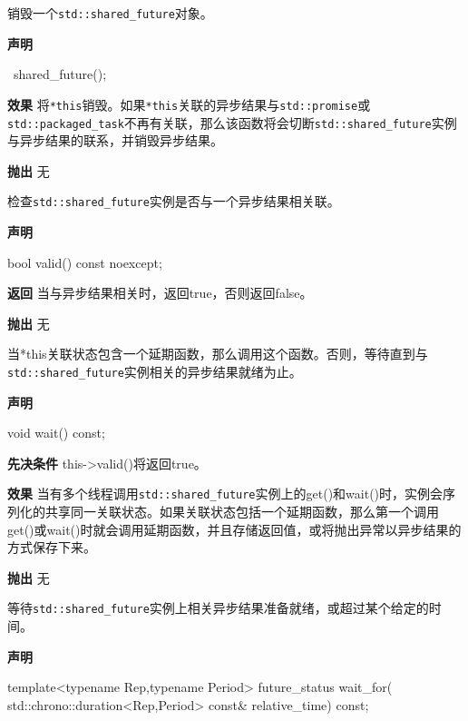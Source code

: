 
销毁一个\texttt{std::shared\_future}对象。

\textbf{声明}

\begin{cpp}
~shared_future();
\end{cpp}

\textbf{效果}
将\texttt{*this}销毁。如果\texttt{*this}关联的异步结果与\texttt{std::promise}或\texttt{std::packaged\_task}不再有关联，那么该函数将会切断\texttt{std::shared\_future}实例与异步结果的联系，并销毁异步结果。

\textbf{抛出}
无


检查\texttt{std::shared\_future}实例是否与一个异步结果相关联。

\textbf{声明}

\begin{cpp}
bool valid() const noexcept;
\end{cpp}

\textbf{返回}
当与异步结果相关时，返回true，否则返回false。

\textbf{抛出}
无


当*this关联状态包含一个延期函数，那么调用这个函数。否则，等待直到与\texttt{std::shared\_future}实例相关的异步结果就绪为止。

\textbf{声明}

\begin{cpp}
void wait() const;
\end{cpp}

\textbf{先决条件}
this->valid()将返回true。

\textbf{效果}
当有多个线程调用\texttt{std::shared\_future}实例上的get()和wait()时，实例会序列化的共享同一关联状态。如果关联状态包括一个延期函数，那么第一个调用get()或wait()时就会调用延期函数，并且存储返回值，或将抛出异常以异步结果的方式保存下来。

\textbf{抛出}
无


等待\texttt{std::shared\_future}实例上相关异步结果准备就绪，或超过某个给定的时间。

\textbf{声明}

\begin{cpp}
template<typename Rep,typename Period>
future_status wait_for(
    std::chrono::duration<Rep,Period> const& relative_time) const;
\end{cpp}

